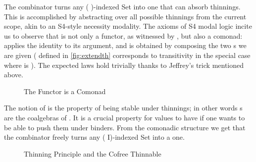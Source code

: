 The  combinator turns any ( )-indexed Set into
one that can absorb thinnings. This is accomplished by abstracting
over all possible thinnings from the current scope, akin to an
S4-style necessity modality. The axioms of S4 modal logic incite us
to observe that  is not only a functor, as witnessed by
, but also a comonad:  applies
the identity  to its argument, and  is obtained
by composing the two s we are given ( defined in
\cref{fig:extendth} corresponds to transitivity in the special case
where  is ). The expected laws hold trivially thanks
to Jeffrey's trick mentioned above.

\begin{figure}[h]
\begin{minipage}{0.5\textwidth}
\end{minipage}\begin{minipage}{0.5\textwidth}
\end{minipage}

\begin{minipage}{0.5\textwidth}
\end{minipage}\begin{minipage}{0.5\textwidth}
\end{minipage}
\caption{The  Functor is a Comonad}
\end{figure}

The notion of  is the property of being stable under thinnings;
in other words s are the coalgebras of .
It is a crucial property for values to have if one wants to be able to push
them under binders. From the comonadic structure we get that
the  combinator freely turns any ( I)-indexed Set into a
 one.

\begin{figure}[h]
\begin{minipage}{0.5\textwidth}
\end{minipage}\begin{minipage}{0.5\textwidth}
\end{minipage}
\caption{Thinning Principle and the Cofree Thinnable \label{fig:Thinnable}}
\end{figure}

